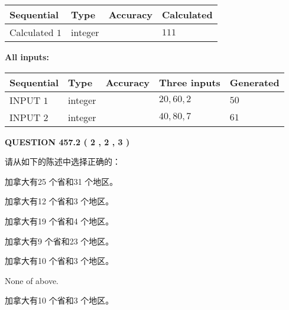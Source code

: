 \documentclass{ctexart}
\begin{document}
  
\noindent\begin{tabular}{|l|l|l|l|}
\hline
 Sequential & Type & Accuracy & Calculated \\ 
\hline
 
 
  Calculated $  1 $ & integer &  & 
  $ 111 $ 
 \\  \hline  
 \end{tabular}
   
   
   
   
\noindent\vspace{0.1in}\hspace{-0.08in} {\textbf{\Large{All inputs: }}}
   
   
  
  
\noindent\begin{tabular}{|l|l|l|l|l|}
\hline
 Sequential & Type & Accuracy & Three inputs & Generated \\ 
\hline
 
 
  INPUT $  1 $ & integer &  & $
 20
 , 
 60
 , 
 2
 $ & $ 50 $ 
 \\  \hline  
 
 
  INPUT $  2 $ & integer &  & $
 40
 , 
 80
 , 
 7
 $ & $ 61 $ 
 \\  \hline  
 \end{tabular}
   
   
  
\vspace{0.2in}
  
{\textbf{\Large{QUESTION
457.2 
 ( 2 , 2 , 3 )
}}}
  
  
请从如下的陈述中选择正确的：
 
 
加拿大有25 个省和31 个地区。
 
 
加拿大有12 个省和3 个地区。
 
 
加拿大有19 个省和4 个地区。
 
 
加拿大有9 个省和23 个地区。
 
 
加拿大有10 个省和3 个地区。
 
 
 None of above.
 
 
\noindent{}
 
 
加拿大有10 个省和3 个地区。
 
 
\noindent{}
 
\end{document}
